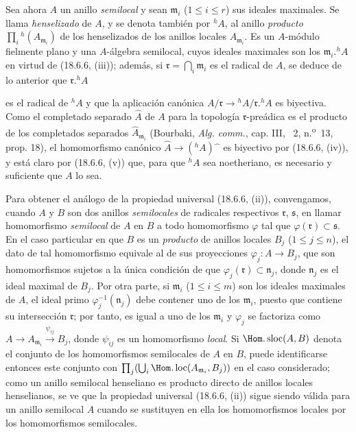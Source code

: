 \begin{env}[18.6.7]
\label{IV.18.6.7}
Sea ahora $A$ un anillo \emph{semilocal} y sean $\mathfrak m_i$ ($1\leq i\leq r$) sus ideales maximales. Se llama \emph{henselizado} de $A$, y se denota también por ${}^h\!A$, al anillo \emph{producto} $\prod_i{}^h(A_{\mathfrak m_i})$ de los henselizados de los anillos locales $A_{\mathfrak m_i}$. Es un $A$-módulo fielmente plano y una $A$-álgebra semilocal, cuyos ideales maximales son los $\mathfrak m_i.{}^h\!A$ en virtud de (18.6.6, (iii)); además, si $\mathfrak r=\bigcap_i\mathfrak m_i$ es el radical de $A$, se deduce de lo anterior que $\mathfrak r.{}^h\!A$


es el radical de ${}^h\!A$ y que la aplicación canónica $A/\mathfrak r\to{}^h\!A/\mathfrak r.{}^h\!A$ es biyectiva. Como el completado separado $\widehat A$ de $A$ para la topología $\mathfrak r$-preádica es el producto de los completados separados $\widehat A_{\mathfrak m_i}$ (Bourbaki, \emph{Alg. comm.}, cap. III, \textsection~2, n.\textsuperscript{o}~13, prop. 18), el homomorfismo canónico $\widehat A\to({}^h\!A)\widehat{\phantom{x}}$ es biyectivo por (18.6.6, (iv)), y está claro por (18.6.6, (v)) que, para que ${}^h\!A$ sea noetheriano, es necesario y suficiente que $A$ lo sea.

Para obtener el análogo de la propiedad universal (18.6.6, (ii)), convengamos, cuando $A$ y $B$ son dos anillos \emph{semilocales} de radicales respectivos $\mathfrak r$, $\mathfrak s$, en llamar homomorfismo \emph{semilocal} de $A$ en $B$ a todo homomorfismo $\varphi$ tal que $\varphi(\mathfrak r)\subset\mathfrak s$. En el caso particular en que $B$ es un \emph{producto} de anillos locales $B_j$ ($1\leq j\leq n$), el dato de tal homomorfismo equivale al de sus proyecciones $\varphi_j:A\to B_j$, que son homomorfismos sujetos a la única condición de que $\varphi_j(\mathfrak r)\subset\mathfrak n_j$, donde $\mathfrak n_j$ es el ideal maximal de $B_j$. Por otra parte, si $\mathfrak m_i$ ($1\leq i\leq m$) son los ideales maximales de $A$, el ideal primo $\varphi_j^{-1}(\mathfrak n_j)$ debe contener uno de los $\mathfrak m_i$, puesto que contiene su intersección $\mathfrak r$; por tanto, es igual a uno de los $\mathfrak m_i$ y $\varphi_j$ se factoriza como $A\to A_{\mathfrak m_i}\xrightarrow{\psi_{ij}}B_j$, donde $\psi_{ij}$ es un homomorfismo \emph{local}. Si $\Hom.\operatorname{sloc}(A,B)$ denota el conjunto de los homomorfismos semilocales de $A$ en $B$, puede identificarse entonces este conjunto con
$\prod_j(\bigcup_i\Hom.\operatorname{loc}(A_{\mathfrak m_i},B_j))$
en el caso considerado; como un anillo semilocal henseliano es producto directo de anillos locales henselianos, se ve que la propiedad universal (18.6.6, (ii)) sigue siendo válida para un anillo semilocal $A$ cuando se sustituyen en ella los homomorfismos locales por los homomorfismos semilocales.
\end{env}

